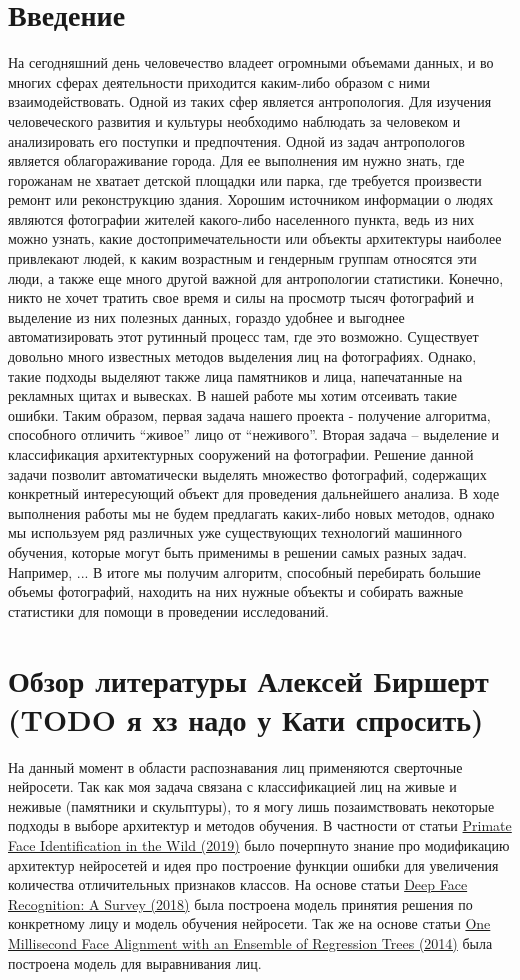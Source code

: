 \documentclass[a4paper,14pt]{extarticle}
\newcommand{\bibref}[3]{\hyperlink{#1}{#2 (#3)}} %
\begin{document}
    \section{Введение}
    На сегодняшний день человечество владеет огромными объемами данных, и во многих сферах деятельности приходится каким-либо образом с ними взаимодействовать. Одной из таких сфер является антропология. Для изучения человеческого развития и культуры необходимо наблюдать за человеком и анализировать его поступки и предпочтения. Одной из задач антропологов является облагораживание города. Для ее выполнения им нужно знать, где горожанам не хватает детской площадки или парка, где требуется произвести ремонт или реконструкцию здания. Хорошим источником информации о людях являются фотографии жителей какого-либо населенного пункта, ведь из них можно узнать, какие достопримечательности или объекты архитектуры наиболее привлекают людей, к каким возрастным и гендерным группам относятся эти люди, а также еще много другой важной для антропологии статистики. Конечно, никто не хочет тратить свое время и силы на просмотр тысяч фотографий и выделение из них полезных данных, гораздо удобнее и выгоднее автоматизировать этот рутинный процесс там, где это возможно.
    Существует довольно много известных методов выделения лиц на фотографиях. Однако, такие подходы выделяют также лица памятников и лица, напечатанные на рекламных щитах и вывесках. В нашей работе мы хотим отсеивать такие ошибки. Таким образом, первая задача нашего проекта - получение алгоритма, способного отличить “живое” лицо от “неживого”.
    Вторая задача – выделение и классификация архитектурных сооружений на фотографии. Решение данной задачи позволит автоматически выделять множество фотографий, содержащих конкретный интересующий объект для проведения дальнейшего анализа.
    В ходе выполнения работы мы не будем предлагать каких-либо новых методов, однако мы используем ряд различных уже существующих технологий машинного обучения, которые могут быть применимы в решении самых разных задач. Например, ... В итоге мы получим алгоритм, способный перебирать большие объемы фотографий, находить на них нужные объекты и собирать важные статистики для помощи в проведении исследований.

    \section{Обзор литературы Алексей Биршерт (TODO я хз надо у Кати спросить)}
    На данный момент в области распознавания лиц применяются сверточные нейросети. Так как моя задача связана с классификацией лиц на живые и неживые (памятники и скульптуры), то я могу лишь позаимствовать некоторые подходы в выборе архитектур и методов обучения. В частности от статьи \bibref{pfid}{Primate Face Identification in the Wild}{2019} было почерпнуто знание про модификацию архитектур нейросетей и идея про построение функции ошибки для увеличения количества отличительных признаков классов. На основе статьи \bibref{face}{Deep Face Recognition: A Survey}{2018} была построена модель принятия решения по конкретному лицу и модель обучения нейросети. Так же на основе статьи \bibref{align}{One Millisecond Face Alignment with an Ensemble of Regression Trees}{2014} была построена модель для выравнивания лиц.
\end{document}
